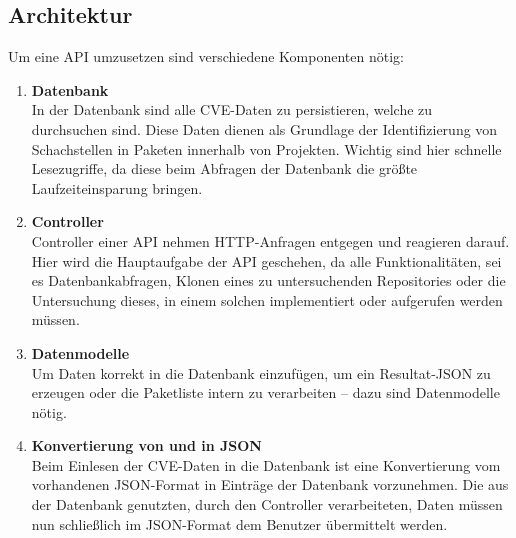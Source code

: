 \subsection{Architektur} \label{sec:Architektur}
Um eine API umzusetzen sind verschiedene Komponenten nötig:
\begin{enumerate}
    \item \textbf{Datenbank} \\
        In der Datenbank sind alle CVE-Daten zu persistieren, welche zu durchsuchen sind.
        Diese Daten dienen als Grundlage der Identifizierung von Schachstellen in Paketen innerhalb von Projekten.
        Wichtig sind hier schnelle Lesezugriffe, da diese beim Abfragen der Datenbank die größte Laufzeiteinsparung bringen. 
    \item \textbf{Controller} \\
        Controller einer API nehmen HTTP-Anfragen entgegen und reagieren darauf.
        Hier wird die Hauptaufgabe der API geschehen, da alle Funktionalitäten, sei es Datenbankabfragen, Klonen eines zu untersuchenden Repositories oder die Untersuchung dieses, in einem solchen implementiert oder aufgerufen werden müssen.
    \item \textbf{Datenmodelle} \\
        Um Daten korrekt in die Datenbank einzufügen, um ein Resultat-JSON zu erzeugen oder die Paketliste intern zu verarbeiten -- dazu sind Datenmodelle nötig.
    \item \textbf{Konvertierung von und in JSON} \\
        Beim Einlesen der CVE-Daten in die Datenbank ist eine Konvertierung vom vorhandenen JSON-Format in Einträge der Datenbank vorzunehmen.  
        Die aus der Datenbank genutzten, durch den Controller verarbeiteten, Daten müssen nun schließlich im JSON-Format dem Benutzer übermittelt werden.
\end{enumerate}